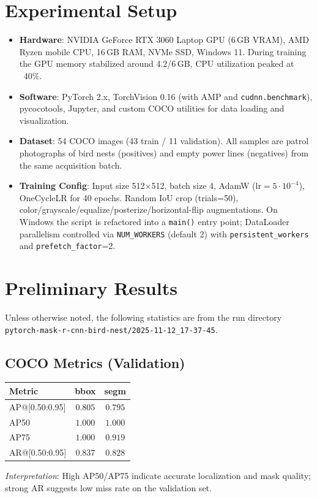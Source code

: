 \documentclass[11pt,a4paper]{article}
\begin{document}
\section{Experimental Setup}
\begin{itemize}[leftmargin=*]
  \item \textbf{Hardware}: NVIDIA GeForce RTX 3060 Laptop GPU (6\,GB VRAM), AMD Ryzen mobile CPU, 16\,GB RAM, NVMe SSD, Windows 11. During training the GPU memory stabilized around 4.2/6\,GB, CPU utilization peaked at ~40\%.
  \item \textbf{Software}: PyTorch 2.x, TorchVision 0.16 (with AMP and \texttt{cudnn.benchmark}), pycocotools, Jupyter, and custom COCO utilities for data loading and visualization.
  \item \textbf{Dataset}: 54 COCO images (43 train / 11 validation). All samples are patrol photographs of bird nests (positives) and empty power lines (negatives) from the same acquisition batch.
  \item \textbf{Training Config}: Input size 512$\times$512, batch size 4, AdamW ($\text{lr}=5\cdot 10^{-4}$), OneCycleLR for 40 epochs. Random IoU crop (trials=50), color/grayscale/equalize/posterize/horizontal-flip augmentations. On Windows the script is refactored into a \texttt{main()} entry point; DataLoader parallelism controlled via \texttt{NUM\_WORKERS} (default 2) with \texttt{persistent\_workers} and \texttt{prefetch\_factor}=2.
\end{itemize}

\section{Preliminary Results}
Unless otherwise noted, the following statistics are from the run directory \texttt{pytorch-mask-r-cnn-bird-nest/2025-11-12\_17-37-45}.

\subsection{COCO Metrics (Validation)}
\begin{center}
\begin{tabular}{lcc}
\toprule
Metric & \textbf{bbox} & \textbf{segm} \\
\midrule
AP@[0.50:0.95] & \(\mathbf{0.805}\) & \(\mathbf{0.795}\) \\
AP50 & \(1.000\) & \(1.000\) \\
AP75 & \(1.000\) & \(0.919\) \\
AR@[0.50:0.95] & \(0.837\) & \(0.828\) \\
\bottomrule
\end{tabular}
\end{center}
\textit{Interpretation}: High AP50/AP75 indicate accurate localization and mask quality; strong AR suggests low miss rate on the validation set.
\end{document}
